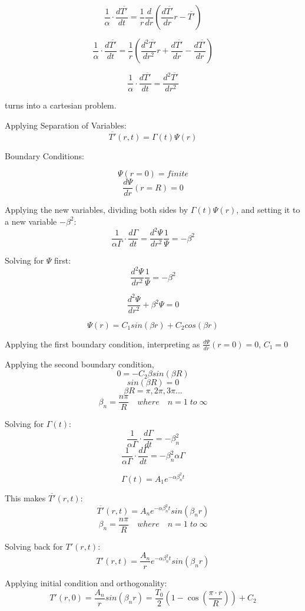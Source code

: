 \documentclass[12pt,letterpaper]{article}
\begin{document}
\[\frac{1}{\alpha} \cdot \frac{d\overline{T'}}{dt} = \frac{1}{r} \frac{d}{dr} (\frac{d\overline{T'}}{dr} r - \overline{T'}) \]

\[\frac{1}{\alpha} \cdot \frac{d\overline{T'}}{dt} = \frac{1}{r} (\frac{d^2\overline{T'}}{dr^2} r + \frac{d\overline{T'}}{dr} - \frac{d\overline{T'}}{dr}) \]

\[\frac{1}{\alpha} \cdot \frac{d\overline{T'}}{dt} = \frac{d^2\overline{T'}}{dr^2} \]

turns into a cartesian problem.

Applying Separation of Variables:
\[\overline{T'}(r,t) = \Gamma (t) \Psi (r)  \]

Boundary Conditions:

\[\Psi(r = 0) = finite \]
\[\frac{d\Psi}{dr} (r = R) = 0 \]

Applying the new variables, dividing both sides by $\Gamma (t) \Psi (r) $,
and setting it to a new variable $ -\beta^2 $:
\[\frac{1}{\alpha  \Gamma} \cdot \frac{d\Gamma}{dt} = \frac{d^2 \Psi}{dr^2} \frac{1}{\Psi} = -\beta^2 \] 

Solving for $\Psi$ first:
\[\frac{d^2 \Psi}{dr^2} \frac{1}{\Psi} = -\beta^2 \]

\[\frac{d^2 \Psi}{dr^2} + \beta^2 \Psi = 0 \]

\[\Psi (r) = C_1 sin(\beta r) + C_2 cos(\beta r) \]

Applying the first boundary condition,
interpreting as $\frac{d\Psi}{dr} (r = 0) = 0$, $C_1 = 0 $

Applying the second boundary condition,
\[0 =  -C_2 \beta sin(\beta R) \]
\[sin(\beta R) = 0  \]
\[\beta R = \pi, 2\pi, 3\pi ... \]
\[\beta_n = \frac{n\pi}{R} \quad where \quad n = 1 \; to \; \infty \]

Solving for $\Gamma(t)$:
\[\frac{1}{\alpha  \Gamma} \cdot \frac{d\Gamma}{dt} = -\beta_n^2 \]
\[\frac{1}{\alpha  \Gamma} \cdot \frac{d\Gamma}{dt} = -\beta_n^2 \alpha \Gamma \]

\[\Gamma(t) = A_1 e^{-\alpha \beta_n^2 t }\]

This makes $\overline{T'}(r,t)$:
\[\overline{T'}(r,t) = A_n e^{-\alpha \beta_n^2 t} sin(\beta_n r)\]
\[\beta_n = \frac{n\pi}{R} \quad where \quad n = 1 \; to \; \infty \]

Solving back for $T'(r,t)$:
\[T'(r,t) = \frac{A_n}{r} e^{-\alpha \beta_n^2 t} sin(\beta_n r)\]

Applying initial condition and orthogonality:
\[T'(r,0) = \frac{A_n}{r} sin(\beta_n r) = \frac{T_0}{2} (1-\cos{(\frac{\pi \cdot r}{R})}) + C_2\]
\end{document}
